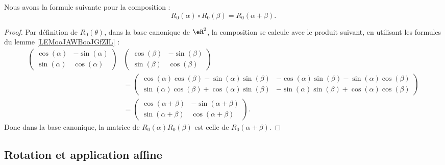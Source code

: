 \begin{proposition}     \label{PROPooISUCooRYJcwo}
	Nous avons la formule suivante pour la composition :
	\begin{equation}
		R_0(\alpha)\circ R_0(\beta)=R_0(\alpha+\beta).
	\end{equation}
\end{proposition}

\begin{proof}
	Par définition de \( R_0(\theta)\), dans la base canonique de \( \eR^2\), la composition se calcule avec le produit suivant, en utilisant les formules du lemme \ref{LEMooJAWBooJGfZIL} :
	\begin{subequations}
		\begin{align}
			\begin{pmatrix}
				\cos(\alpha) & -\sin(\alpha) \\
				\sin(\alpha) & \cos(\alpha)
			\end{pmatrix} & \begin{pmatrix}
				\cos(\beta) & -\sin(\beta) \\
				\sin(\beta) & \cos(\beta)
			\end{pmatrix}   \\
			                            & =\begin{pmatrix}
				\cos(\alpha)\cos(\beta)  -\sin(\alpha)\sin(\beta) & -\cos(\alpha)\sin(\beta)-\sin(\alpha)\cos(\beta) \\
				\sin(\alpha)\cos(\beta)+\cos(\alpha)\sin(\beta)   & -\sin(\alpha)\sin(\beta)+\cos(\alpha)\cos(\beta)
			\end{pmatrix}  \\
			                            & =\begin{pmatrix}
				\cos(\alpha+\beta) & -\sin(\alpha+\beta) \\
				\sin(\alpha+\beta) & \cos(\alpha+\beta)
			\end{pmatrix}.
		\end{align}
	\end{subequations}
	Donc dans la base canonique, la matrice de \( R_0(\alpha)R_0(\beta)\) est celle de \( R_0(\alpha+\beta)\).
\end{proof}

\subsection{Rotation et application affine}

